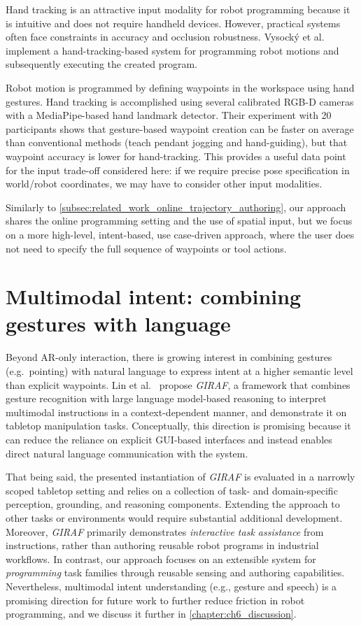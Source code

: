 Hand tracking is an attractive input modality for robot programming because it is intuitive and does not require handheld devices. However, practical systems often face constraints in accuracy and occlusion robustness. Vysocký et al.~\cite{Vysocky2023} implement a hand-tracking-based system for programming robot motions and subsequently executing the created program.

Robot motion is programmed by defining waypoints in the workspace using hand gestures. Hand tracking is accomplished using several calibrated RGB-D cameras with a MediaPipe-based \cite{MediaPipeRoot} hand landmark detector. Their experiment with 20 participants shows that gesture-based waypoint creation can be faster on average than conventional methods (teach pendant jogging and hand-guiding), but that waypoint accuracy is lower for hand-tracking. This provides a useful data point for the input trade-off considered here: if we require precise pose specification in world/robot coordinates, we may have to consider other input modalities.

Similarly to \autoref{subsec:related_work_online_trajectory_authoring}, our approach shares the online programming setting and the use of spatial input, but we focus on a more high-level, intent-based, use case-driven approach, where the user does not need to specify the full sequence of waypoints or tool actions.

\section{Multimodal intent: combining gestures with language}

Beyond AR-only interaction, there is growing interest in combining gestures (e.g.\ pointing) with natural language to express intent at a higher semantic level than explicit waypoints. Lin et al.~\cite{Lin2023} propose \emph{GIRAF}, a framework that combines gesture recognition with large language model-based reasoning to interpret multimodal instructions in a context-dependent manner, and demonstrate it on tabletop manipulation tasks. Conceptually, this direction is promising because it can reduce the reliance on explicit GUI-based interfaces and instead enables direct natural language communication with the system.

That being said, the presented instantiation of \emph{GIRAF} is evaluated in a narrowly scoped tabletop setting and relies on a collection of task- and domain-specific perception, grounding, and reasoning components. Extending the approach to other tasks or environments would require substantial additional development. Moreover, \emph{GIRAF} primarily demonstrates \emph{interactive task assistance} from instructions, rather than authoring reusable robot programs in industrial workflows. In contrast, our approach focuses on an extensible system for \emph{programming} task families through reusable sensing and authoring capabilities. Nevertheless, multimodal intent understanding (e.g., gesture and speech) is a promising direction for future work to further reduce friction in robot programming, and we discuss it further in \autoref{chapter:ch6_discussion}.

